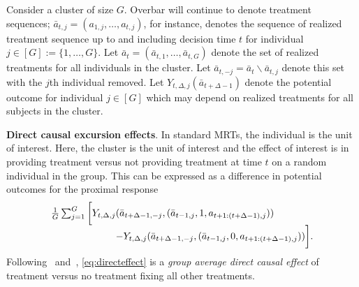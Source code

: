 \documentclass[lineno]{biometrika}
\begin{document}
Consider a cluster of size $G$.  Overbar will continue to denote treatment sequences; $\bar a_{t,j} = (a_{1,j},\ldots, a_{t,j})$, for instance, denotes the sequence of realized treatment sequence up to and including decision time $t$ for individual $j \in [G]:=\{1,\ldots, G\}$.   Let $\bar a_{t} = (\bar a_{t,1}, \ldots, \bar a_{t,G})$ denote the set of realized treatments for all individuals in the cluster. Let $\bar a_{t,-j} = \bar a_t \backslash \bar a_{t,j}$ denote this set with the $j$th individual removed. Let $Y_{t,\Delta,j} (\bar a_{t+\Delta-1})$ denote the potential outcome for individual $j \in [G]$ which may depend on realized treatments for all subjects in the cluster.

\noindent \textbf{Direct causal excursion effects}.
In standard MRTs, the individual is the unit of interest.  Here, the cluster is the unit of interest and the effect of interest is in providing treatment versus not providing treatment at time $t$ on a random individual in the group.  This can be expressed as a difference in potential outcomes for the proximal response
\begin{equation}
\label{eq:directeffect}
\begin{array}{r@{}l}
\frac{1}{G} \sum_{j=1}^G \bigg [ Y_{t, \Delta,j} &(\bar a_{t+\Delta-1,-j}, (\bar a_{t-1,j}, 1, a_{t+1:(t+\Delta-1),j})) \\
&- Y_{t,\Delta, j} (\bar a_{t+\Delta-1,-j}, (\bar a_{t-1,j}, 0, a_{t+1:(t+\Delta-1),j})) \bigg].
\end{array}
\end{equation}
Following~\cite{Halloran1995} and~\cite{Tchetgen2012}, \eqref{eq:directeffect} is a \emph{group average direct causal effect} of treatment versus no treatment fixing all other treatments. 
\end{document}
